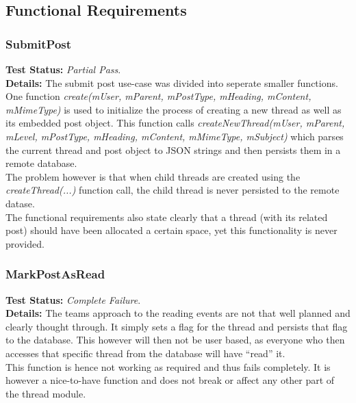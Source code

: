 \subsection{Functional Requirements}
\begin{flushleft}

\subsubsection{SubmitPost}
\begin{flushleft}
\textbf{Test Status:} \emph{Partial Pass}. \\

\textbf{Details:}
The submit post use-case was divided into seperate smaller functions. One function \emph{create(mUser, mParent, mPostType, mHeading, mContent, mMimeType)} is used to initialize the process of creating a new thread as well as its embedded post object. This function calls \emph{createNewThread(mUser, mParent, mLevel, mPostType, mHeading, mContent, mMimeType, mSubject)} which parses the current thread and post object to JSON strings and then persists them in a remote database.\\

The problem however is that when child threads are created using the \emph{createThread(...)} function call, the child thread is never persisted to the remote datase.\\

The functional requirements also state clearly that a thread (with its related post) should have been allocated a certain space, yet this functionality is never provided.

\end{flushleft}
\subsubsection{MarkPostAsRead}
\begin{flushleft}
\textbf{Test Status:} \emph{Complete Failure}. \\

\textbf{Details:}
The teams approach to the reading events are not that well planned and clearly thought through. It simply sets a flag for the thread and persists that flag to the database. This however will then not be user based, as everyone who then accesses that specific thread from the database will have ``read'' it.\\
This function is hence not working as required and thus fails completely. It is however a nice-to-have function and does not break or affect any other part of the thread module.


\end{flushleft}
\end{flushleft}
